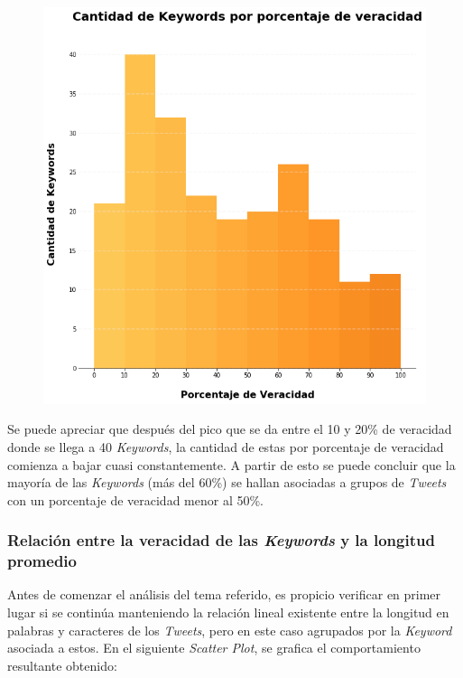 \documentclass[titlepage,a4paper]{article}
\begin{document}
    \begin{figure}[H]
    \centering
    \includegraphics[width=1\textwidth]{graficos/Analisis de Keyword/cantidad_de_keywords_por_porcentaje_de_veracidad.png}
    \caption{} 
    \end{figure}
    
    Se puede apreciar que después del pico que se da entre el 10 y 20\% de veracidad donde se llega a 40 \textit{Keywords}, la cantidad de estas por porcentaje de veracidad comienza a bajar cuasi constantemente. A partir de esto se puede concluir que la mayoría de las \textit{Keywords} (más del 60\%) se hallan asociadas a grupos de \textit{Tweets} con un porcentaje de veracidad menor al 50\%.
        
    \subsubsection{Relación entre la veracidad de las \textit{Keywords} y la longitud promedio}
    
    Antes de comenzar el análisis del tema referido, es propicio verificar en primer lugar si se continúa manteniendo la relación lineal existente entre la longitud en palabras y caracteres de los \textit{Tweets}, pero en este caso agrupados por la \textit{Keyword} asociada a estos. En el siguiente \textit{Scatter Plot}, se grafica el comportamiento resultante obtenido:
    
\end{document}
